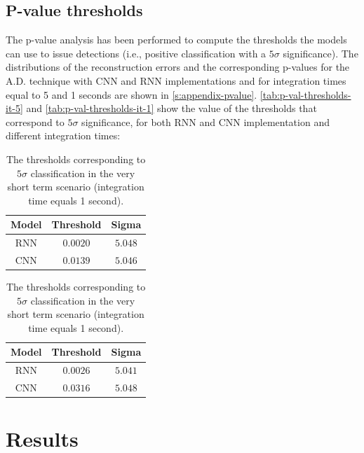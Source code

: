 \subsection{P-value thresholds}
\label{s:p-values-results}
The p-value analysis has been performed to compute the thresholds the models can use to issue detections (i.e., positive classification with a $5\sigma$ significance). The distributions of the reconstruction errors and the corresponding p-values for the A.D. technique with CNN and RNN implementations and for integration times equal to 5 and 1 seconds are shown in \autoref{s:appendix-pvalue}. \autoref{tab:p-val-thresholds-it-5} and \autoref{tab:p-val-thresholds-it-1} show the value of the thresholds that correspond to $5\sigma$ significance, for both RNN and CNN implementation and different integration times:
\begin{table}[ht]
\centering
\begin{tabular}{|c|c|c|}
    \hline
    Model & Threshold & Sigma \\ 
    \hline
    RNN & $0.0020$ & $5.048$ \\
    CNN & $0.0139$ & $5.046$ \\
    \hline
    \end{tabular}
\caption{The thresholds corresponding to $5\sigma$ classification in the short term scenario (integration time equals 5 seconds).}
\label{tab:p-val-thresholds-it-5}
\vspace{1cm}
\centering
\begin{tabular}{|c|c|c|}
    \hline
    Model & Threshold & Sigma \\ 
    \hline
    RNN & $0.0026$ & $5.041$ \\
    CNN & $0.0316$ & $5.048$ \\
    \hline
\end{tabular}
\caption{The thresholds corresponding to $5\sigma$ classification in the very short term scenario (integration time equals 1 second).}
\label{tab:p-val-thresholds-it-1}
\end{table}



 
\section{Results}
\label{s:Experiment-Results}

